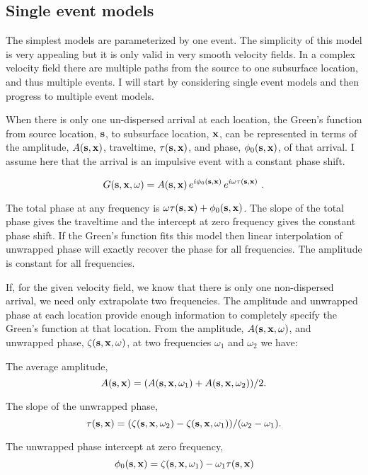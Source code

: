 \subsection{Single event models}

The simplest models are parameterized by one event. The simplicity of
this model is very appealing but it is only valid in very smooth
velocity fields. In a complex velocity field there are multiple paths
from the source to one subsurface location, and thus multiple events.
I will start by considering single event models and then progress to
multiple event models.

When there is only one un-dispersed arrival at each location, the
Green's function from source location, $\bf{s}$, to subsurface
location, $\bf{x}$, can be represented in terms of the amplitude,
$A({\bf s}, {\bf x} )$, traveltime, $\tau({\bf s},{\bf x})$, and
phase, $\phi_0(\bf{s},{\bf x})$, of that arrival. I assume here that
the arrival is an impulsive event with a constant phase shift. 

$$
G({\bf s},{\bf x},\omega ) = A({\bf s},{\bf x})\,e^{i \phi_0({\bf s},{\bf x}) }\,e^{i\omega \tau({\bf s},{\bf x})} \ .
$$

The total phase at any frequency is $\omega \tau({\bf s},{\bf x}) +
\phi_0({\bf s},{\bf x})$. The slope of the total phase gives the
traveltime and the intercept at zero frequency gives the constant
phase shift. If the Green's function fits this model then linear
interpolation of unwrapped phase will exactly recover the phase for
all frequencies. The amplitude is constant for all frequencies.

If, for the given velocity field, we know that there is only one
non-dispersed arrival, we need only extrapolate two frequencies. The
amplitude and unwrapped phase at each location provide enough
information to completely specify the Green's function at that
location.
From the amplitude, $A({\bf s},{\bf x},\omega)$, and unwrapped phase,
$\zeta({\bf s},{\bf x},\omega)$, at two frequencies $\omega_1$ and
$\omega_2$ we have:

The average amplitude,
$$
A({\bf s},{\bf x}) =  ( A({\bf s},{\bf x},\omega_1) + A({\bf s},{\bf x},\omega_2) )/2.
$$

The slope of the unwrapped phase,
$$
\tau({\bf s},{\bf x}) = ( \zeta({\bf s},{\bf x},\omega_2) - \zeta({\bf s},{\bf x},\omega_1) ) /( \omega_2 - \omega_1 ).
$$

The unwrapped phase intercept at zero frequency,
$$
 \phi_0({\bf s},{\bf x})  =  \zeta({\bf s},{\bf x},\omega_1) - \omega_1\tau({\bf s},{\bf x})
$$

